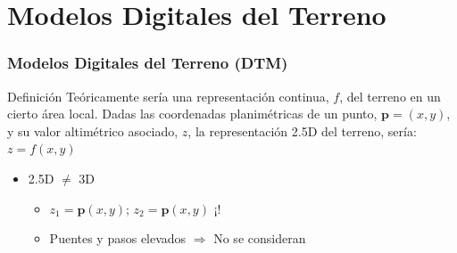 \section[DTM]{Modelos Digitales del Terreno}
\begin{frame}
  \frametitle{Modelos Digitales del Terreno (DTM)}
  \begin{beamerboxesrounded}[shadow=true]{Definición}
    Teóricamente sería una representación continua, $f$, del terreno en un
    cierto área local. Dadas las coordenadas planimétricas de un punto,
    $\mathbf{p}=(x,y)$, y su valor altimétrico asociado, $z$, la representación
    \alert<1>{2.5D} del terreno, sería: $z=f(x,y)$
  \end{beamerboxesrounded}
  \begin{itemize}
    \item<2-> \alert<2>{2.5D $\ne$ 3D}
      \begin{itemize}
        \item<3-> $z_1 = \mathbf{p}(x,y)$; $z_2 = \mathbf{p}(x,y)$ \alert<3>{¡!}
        \item<4-> Puentes y pasos elevados $\Rightarrow$ \alert<4>{No se consideran}
      \end{itemize}
  \end{itemize}
\end{frame}

